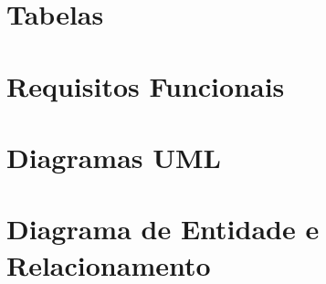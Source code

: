 \documentclass{acm_proc_article-sp}
\begin{document}
\begin{appendices}

\chapter{Tabelas}

\chapter{Requisitos Funcionais}

\chapter{Diagramas UML}

\chapter{Diagrama de Entidade e Relacionamento}


\end{appendices}
\end{document}
